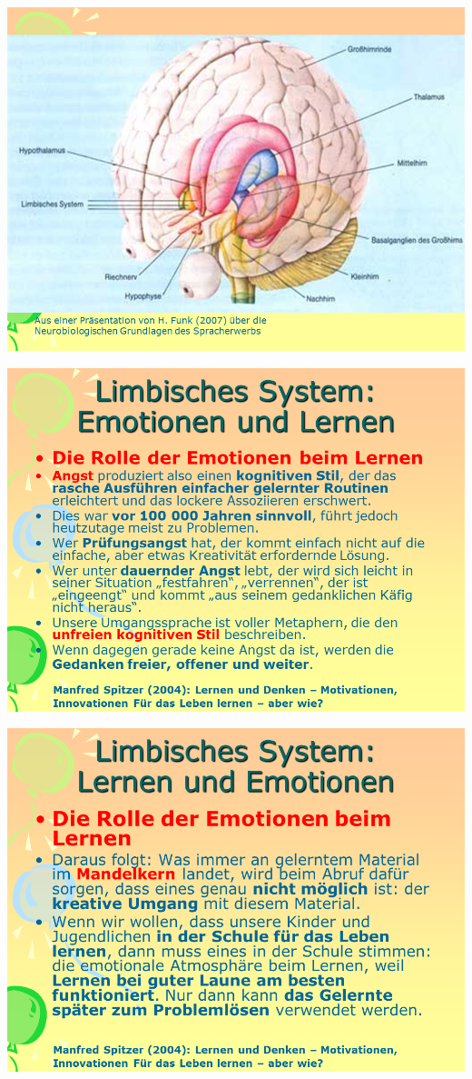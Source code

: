 \documentclass[
  letterpaper,
]{scrbook}
\begin{document}
\includegraphics[width=1\textwidth,height=\textheight]{./pictures/neuro/Diapozitiv61.PNG}

\includegraphics[width=1\textwidth,height=\textheight]{./pictures/neuro/Diapozitiv62.PNG}

\includegraphics[width=1\textwidth,height=\textheight]{./pictures/neuro/Diapozitiv63.PNG}
\end{document}
